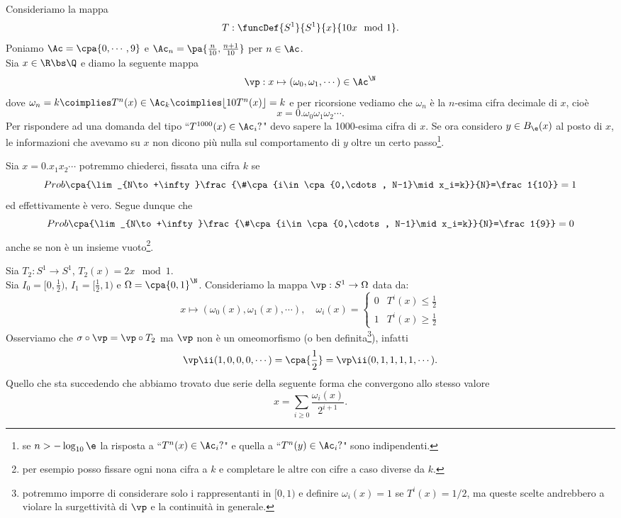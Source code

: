 \begin{example}
Consideriamo la mappa
\[T:\funcDef{S^1}{S^1}{x}{10x \mod 1}.\]
Poniamo $\Ac=\cpa{0,\cdots,9}$ e $\Ac_n=\pa{\frac n{10},\frac{n+1}{10}}$ per $n\in\Ac$.\\
Sia $x\in \R\bs \Q$ e diamo la seguente mappa
\[\vp:x\mapsto(\omega_0,\omega_1,\cdots)\in \Ac^{\N}\]
dove $\omega_n=k\coimplies T^n(x)\in \Ac_k\coimplies \lfloor10 T^n(x)\rfloor=k$ e per ricorsione vediamo che $\omega_n$ \`e la $n$-esima cifra decimale di $x$, cio\`e
\[x=0.\omega_0\omega_1\omega_2\cdots.\]
Per rispondere ad una domanda del tipo ``$T^{1000}(x)\in \Ac_i?$" devo sapere la 1000-esima cifra di $x$. Se ora considero $y\in B_\e(x)$ al posto di $x$, le informazioni che avevamo su $x$ non dicono pi\`u nulla sul comportamento di $y$ oltre un certo passo\footnote{se $n>-\log_{10} \e$ la risposta a ``$T^{n}(x)\in \Ac_i?$" e quella a ``$T^{n}(y)\in \Ac_i?$" sono indipendenti.}.
\end{example}
    
\begin{remark}
Sia $x=0.x_1x_2\cdots$ potremmo chiederci, fissata una cifra $k$ se
\[Prob\cpa{\lim_{N\to+\infty}\frac{\#\cpa{i\in \cpa{0,\cdots, N-1}\mid x_i=k}}{N}=\frac1{10}}=1\]
ed effettivamente \`e vero. Segue dunque che
\[Prob\cpa{\lim_{N\to+\infty}\frac{\#\cpa{i\in \cpa{0,\cdots, N-1}\mid x_i=k}}{N}=\frac1{9}}=0\]
anche se non \`e un insieme vuoto\footnote{per esempio posso fissare ogni nona cifra a $k$ e completare le altre con cifre a caso diverse da $k$.}.
\end{remark}

\begin{example}
Sia $T_2:S^1\to S^1$, $T_2(x)=2x\mod 1$.\\
Sia $I_0=[0,\frac12)$, $I_1=[\frac12,1)$ e $\Omega=\cpa{0,1}^\N$. Consideriamo la mappa $\vp:S^1\to \Omega$ data da:
\[x\mapsto (\omega_0(x),\omega_1(x),\cdots),\quad \omega_i(x)=\begin{cases}
0 & T^i(x)\leq \frac12\\
1 & T^i(x)\geq\frac12
\end{cases}\]
Osserviamo che $\sigma\circ \vp=\vp\circ T_2$ ma $\vp$ non \`e un omeomorfismo (o ben definita\footnote{potremmo imporre di considerare solo i rappresentanti in $[0,1)$ e definire $\omega_i(x)=1$ se $T^i(x)=1/2$, ma queste scelte andrebbero a violare la surgettivit\`a di $\vp$ e la continuit\`a in generale.}), infatti
\[\vp\ii(1,0,0,0,\cdots)=\cpa{\frac12}=\vp\ii(0,1,1,1,1,\cdots).\]
Quello che sta succedendo che abbiamo trovato due serie della seguente forma che convergono allo stesso valore
\[x=\sum_{i\geq 0}\frac{\omega_i(x)}{2^{i+1}}.\]
\end{example}

